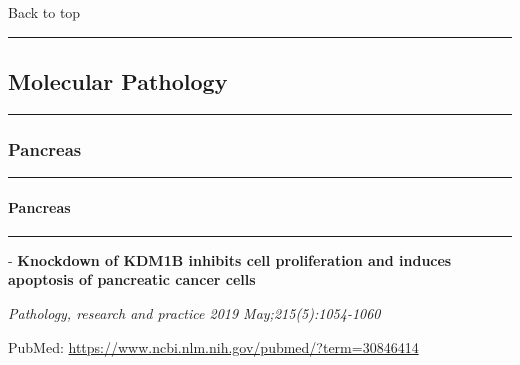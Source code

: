 \documentclass[]{article}
\let\oldparagraph\paragraph
\renewcommand{\paragraph}[1]{\oldparagraph{#1}\mbox{}}
\begin{document}
Back to top

\begin{center}\rule{0.5\linewidth}{\linethickness}\end{center}

\pagebreak

\hypertarget{molecular-pathology}{%
\subsection{Molecular Pathology}\label{molecular-pathology}}

\begin{center}\rule{0.5\linewidth}{\linethickness}\end{center}

\hypertarget{pancreas-1}{%
\subsubsection{Pancreas}\label{pancreas-1}}

\begin{center}\rule{0.5\linewidth}{\linethickness}\end{center}

\hypertarget{pancreas-2}{%
\paragraph{Pancreas}\label{pancreas-2}}

\begin{center}\rule{0.5\linewidth}{\linethickness}\end{center}

 - \textbf{Knockdown of KDM1B inhibits cell proliferation and induces
apoptosis of pancreatic cancer cells}

\emph{Pathology, research and practice 2019 May;215(5):1054-1060}

PubMed: \url{https://www.ncbi.nlm.nih.gov/pubmed/?term=30846414}
\end{document}
